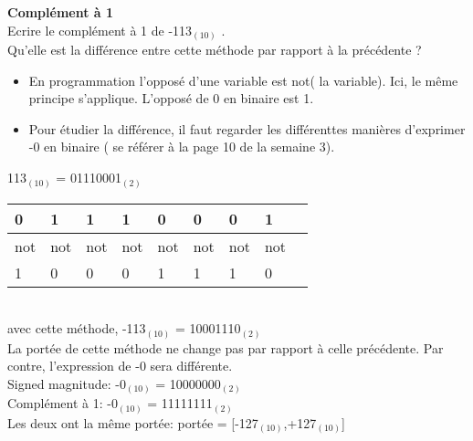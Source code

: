 \begin{Exercice}[15 minutes] \textbf{Complément à 1}\\
    Ecrire le complément à 1 de -113$_{(10)}$ . \\

	Qu'elle est la différence entre cette méthode par rapport à la précédente ? \\

    \begin{conseil}
        \begin{itemize}
        	\item En programmation l'opposé d'une variable est not( la variable). Ici, le même principe s'applique. L'opposé de 0 en binaire est 1.
        	\item Pour étudier la différence, il faut regarder les différenttes manières d'exprimer -0 en binaire ( se référer à la page 10 de la semaine 3).
        \end{itemize} 
    \end{conseil}
    
    \begin{solution}
    	113$_{(10)}$ = 01110001$_{(2)}$ \\
    	
        \begin{tabular}{| p{1cm} | p{1cm} | p{1cm} | p{1cm} | p{1cm} | p{1cm} | p{1cm} | p{1cm} | p{1cm} |} 
            \hline
            0 & 1 & 1 & 1 & 0 & 0 & 0 & 1 \\ [0.5ex] 
            \hline
            not & not & not & not & not & not & not & not \\ [0.5ex]
            \hline
            1 & 0 & 0 & 0 & 1 & 1 & 1 & 0 \\ [0.5ex]
            \hline
        \end{tabular} \\
        
        avec cette méthode, -113$_{(10)}$ = 10001110$_{(2)}$ \\
        
        La portée de cette méthode ne change pas par rapport à celle précédente. Par contre, l'expression de -0 sera différente.\\
        
        Signed magnitude: -0$_{(10)}$ = 10000000$_{(2)}$ \\
        
        Complément à 1: -0$_{(10)}$ = 11111111$_{(2)}$ \\
        
        Les deux ont la même portée: portée = [-127$_{(10)}$,+127$_{(10)}$] \\
        
    \end{solution}
\end{Exercice}

